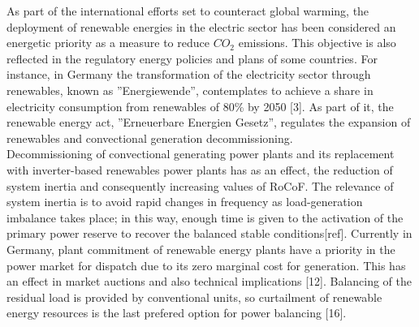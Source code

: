 
  As part of the international efforts set to counteract global warming, the deployment of renewable energies in the electric sector has been considered an energetic priority as a measure to reduce $CO_{2}$ emissions. This objective is also reflected in the regulatory energy policies and plans of some countries. For instance, in Germany the transformation of the electricity sector through renewables, known as ''Energiewende”, contemplates to achieve a share in electricity consumption from renewables of 80\% by 2050 [3]. As part of it, the renewable energy act, ''Erneuerbare Energien Gesetz”, regulates the expansion of renewables and convectional generation decommissioning. \\
    
 Decommissioning of convectional generating power plants and its replacement with inverter-based renewables power plants has as an effect, the reduction of system inertia and consequently increasing values of RoCoF. The relevance of system inertia is to avoid rapid changes in frequency as load-generation imbalance takes place; in this way, enough time is given to the activation of the primary power reserve to recover the balanced stable conditions[ref]. %
 Currently in Germany, plant commitment of renewable energy plants have a priority in the power market for dispatch due to its zero marginal cost for generation. This has an effect in market auctions and also technical implications [12]. Balancing of the residual load is provided by conventional units, so curtailment of renewable energy resources is the last prefered option for power balancing [16].\\
   
